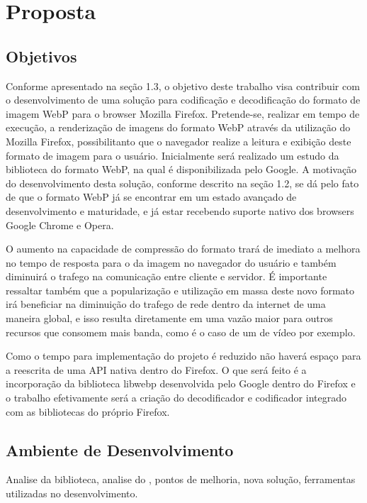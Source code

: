 \documentclass[espaco=simples,appendix=Name]{abnt}
\begin{document}
\chapter{Proposta}
\begin{description}

\section{Objetivos}

\item \noindent
Conforme apresentado na seção 1.3, o objetivo deste trabalho visa contribuir com o desenvolvimento de uma solução para codificação e decodificação do formato de imagem WebP para o browser Mozilla Firefox. 
Pretende-se, realizar em tempo de execução, a renderização de imagens do formato WebP através da utilização do Mozilla Firefox, possibilitanto que o navegador realize a leitura e exibição deste formato de imagem para o usuário. Inicialmente será realizado um estudo da biblioteca do formato WebP, na qual é disponibilizada pelo Google. 
A motivação do desenvolvimento desta solução, conforme descrito na seção 1.2, se dá pelo fato de que o formato WebP já se encontrar em um estado avançado de desenvolvimento e maturidade, e já estar recebendo suporte nativo dos browsers Google Chrome e Opera. 

O aumento na capacidade de compressão do formato  trará de imediato a melhora no tempo de resposta para o  da imagem no navegador do usuário e também diminuirá o trafego na comunicação entre cliente e servidor. É importante ressaltar também que a popularização e utilização em massa deste novo formato irá beneficiar na diminuição do trafego de rede dentro da internet de uma maneira global, e isso resulta diretamente em uma vazão maior para outros recursos que consomem mais banda, como é o caso de um  de vídeo por exemplo.

Como o tempo para implementação do projeto é reduzido não haverá espaço para a reescrita de uma API nativa dentro do Firefox. O que será feito é a incorporação da biblioteca libwebp desenvolvida pelo Google dentro do Firefox e o trabalho efetivamente será a criação do decodificador e codificador integrado com as bibliotecas do próprio Firefox.

\section{Ambiente de Desenvolvimento}
Analise da biblioteca, analise do , pontos de melhoria, nova solução, ferramentas utilizadas no desenvolvimento.


\end{description}
\end{document}
